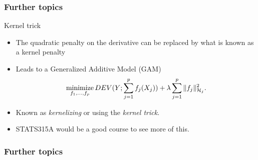 \documentclass[handout]{beamer}
\newcommand{\minimize}{\mathop{\mathrm{minimize}}}
\begin{document}
   \begin{frame} \frametitle{Further topics}

   \begin{block}
   {Kernel trick}
       \begin{itemize}
       \item The quadratic penalty on the derivative
       can be replaced by what is known as a kernel penalty
       \item Leads to a Generalized Additive Model (GAM)
       $$
       \minimize_{f_1, \dots, f_p} DEV(Y;\sum_{j=1}^p f_j(X_j)) +
       \lambda \sum_{j=1}^p \|f_j\|^2_{{\cal H}_j}.
       $$
       \item Known as {\em kernelizing} or using the {\em kernel trick}.
       \item STATS315A would be a good course to see more of this.
       \end{itemize}
   \end{block}
   \end{frame}


   \begin{frame} \frametitle{Further topics}

   \end{frame}

\end{document}

